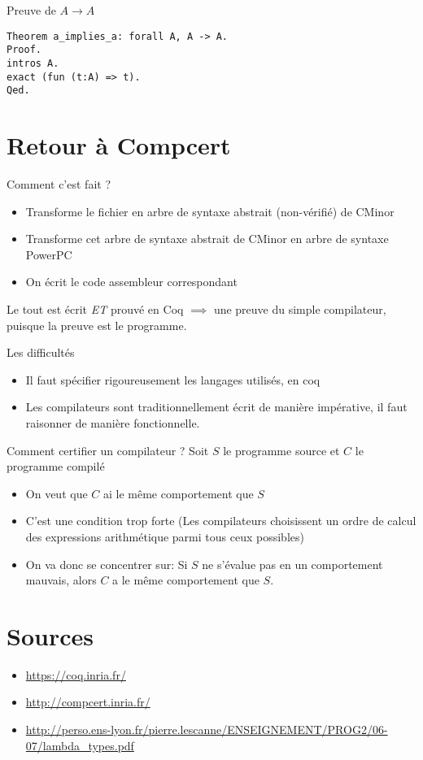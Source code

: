 \documentclass[11pt,a4paper]{beamer}
\theoremstyle{plain}
\theoremstyle{definition}
\theoremstyle{remark}
\begin{document}
\begin{frame}[fragile]{Preuve de $A\rightarrow A$}
\begin{lstlisting}[frame=single]
Theorem a_implies_a: forall A, A -> A.
Proof.
intros A.
exact (fun (t:A) => t).
Qed.
\end{lstlisting}
\end{frame}

\section{Retour à Compcert}

\begin{frame}{Comment c'est fait ?}
	\begin{itemize}
		\item Transforme le fichier en arbre de syntaxe abstrait (non-vérifié) de CMinor
		\item Transforme cet arbre de syntaxe abstrait de CMinor en arbre de syntaxe PowerPC
		\item On écrit le code assembleur correspondant
	\end{itemize}
Le tout est écrit \emph{ET} prouvé en Coq $\implies$ une preuve du simple compilateur, puisque la preuve est le programme.
\end{frame}

\begin{frame}{Les difficultés}
	\begin{itemize}
		\item Il faut spécifier rigoureusement les langages utilisés, en coq
		\item Les compilateurs sont traditionnellement écrit de manière impérative, il faut raisonner de manière fonctionnelle.
	\end{itemize}
\end{frame}

\begin{frame}{Comment certifier un compilateur ?}
Soit $S$ le programme source et $C$ le programme compilé 
	\begin{itemize}
		\item On veut que $C$ ai le même comportement que $S$
		\item C'est une condition trop forte (Les compilateurs choisissent un ordre de calcul des expressions arithmétique parmi tous ceux possibles)
		\item On va donc se concentrer sur: Si $S$ ne s'évalue pas en un comportement mauvais, alors $C$ a le même comportement que $S$.
	\end{itemize}
\end{frame}

\section*{Sources}
\begin{frame}
\begin{itemize}
	\item \url{https://coq.inria.fr/}
	\item \url{http://compcert.inria.fr/}
	\item \url{http://perso.ens-lyon.fr/pierre.lescanne/ENSEIGNEMENT/PROG2/06-07/lambda_types.pdf}
\end{itemize}
\end{frame}
\end{document}
